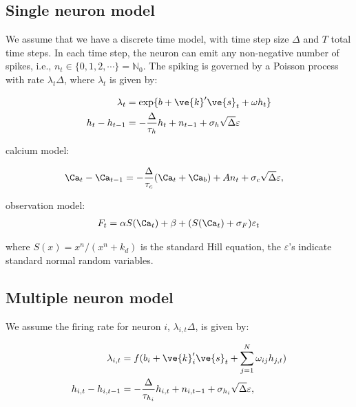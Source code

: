 \subsection{Single neuron model}

We assume that we have a discrete time model, with time step size $\Delta$ and $T$ total time steps. In each time step, the neuron can emit any non-negative number of spikes, i.e., $n_t \in \{0,1,2,\cdots\}=\mathbb{N}_0$.  The spiking is governed by a Poisson process with rate $\lambda_t \Delta$, where $\lambda_t$ is given by: 

\begin{align} \label{eq:1neur}
\lambda_t &= \exp\{b + \ve{k}' \ve{s}_t + \omega h_t\} \\
h_t - h_{t-1}&= - \frac{\Delta}{\tau_h} h_t + n_{t-1} + \sigma_h \sqrt{\Delta} \varepsilon
\end{align} 


calcium model:

\begin{align}
\Ca_t - \Ca_{t-1} &= -\frac{\Delta}{\tau_c}(\Ca_t + \Ca_b) + A n_t + \sigma_c \sqrt{\Delta} \varepsilon, 
\end{align}

observation model:
\begin{align} \label{eq:1obs}
F_t = \alpha S(\Ca_t) + \beta + (S(\Ca_t)+\sigma_F) \varepsilon_t
\end{align} 

\noindent where $S(x)=x^n/(x^n+k_d)$ is the standard Hill equation,  the $\varepsilon$'s indicate standard normal random variables.


\subsection{Multiple neuron model} \label{sec:popmod}

We assume the firing rate for neuron $i$, $\lambda_{i,t} \Delta$, is given by:

\begin{align} \label{eq:poisson}
\lambda_{i,t} &= f(b_i + \ve{k}_i'\ve{s}_t + \sum_{j=1}^N \omega_{ij} h_{j,t}) \\
h_{i,t}-h_{i,t-1} &= -\frac{\Delta}{\tau_{h_i}} h_{i,t} + n_{i,t-1}  + \sigma_{h_i} \sqrt{\Delta} \varepsilon,
\end{align} 

